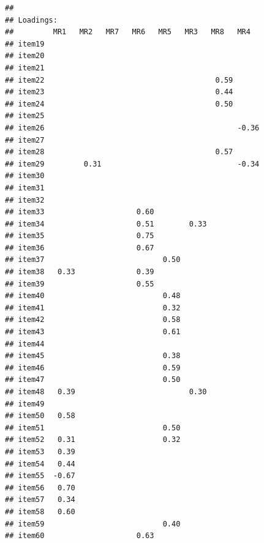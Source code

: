 \documentclass[
  english,
  man]{apa6}
\begin{document}
\begin{verbatim}
## 
## Loadings:
##         MR1   MR2   MR7   MR6   MR5   MR3   MR8   MR4  
## item19                                                 
## item20                                                 
## item21                                                 
## item22                                       0.59      
## item23                                       0.44      
## item24                                       0.50      
## item25                                                 
## item26                                            -0.36
## item27                                                 
## item28                                       0.57      
## item29         0.31                               -0.34
## item30                                                 
## item31                                                 
## item32                                                 
## item33                     0.60                        
## item34                     0.51        0.33            
## item35                     0.75                        
## item36                     0.67                        
## item37                           0.50                  
## item38   0.33              0.39                        
## item39                     0.55                        
## item40                           0.48                  
## item41                           0.32                  
## item42                           0.58                  
## item43                           0.61                  
## item44                                                 
## item45                           0.38                  
## item46                           0.59                  
## item47                           0.50                  
## item48   0.39                          0.30            
## item49                                                 
## item50   0.58                                          
## item51                           0.50                  
## item52   0.31                    0.32                  
## item53   0.39                                          
## item54   0.44                                          
## item55  -0.67                                          
## item56   0.70                                          
## item57   0.34                                          
## item58   0.60                                          
## item59                           0.40                  
## item60                     0.63                        

\end{verbatim}
\end{document}
